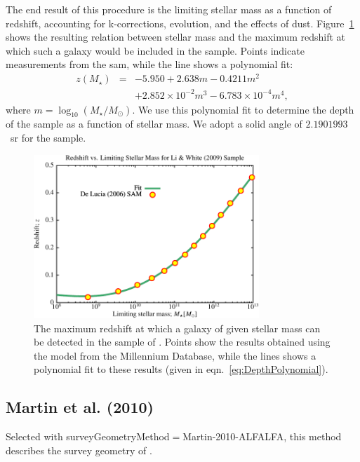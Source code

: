 The end result of this procedure is the limiting stellar mass as a function of redshift, accounting for k-corrections, evolution, and the effects of dust. Figure~\ref{fig:SDSSDepthFit} shows the resulting relation between stellar mass and the maximum redshift at which such a galaxy would be included in the sample. Points indicate measurements from the \gls{sam}, while the line shows a polynomial fit:
\begin{eqnarray}
 z(M_\star) &=& -5.950 + 2.638 m - 0.4211 m^2 \nonumber \\ 
            & & + 2.852\times 10^{-2} m^3 - 6.783 \times 10^{-4} m^4,
 \label{eq:DepthPolynomial}
\end{eqnarray}
where $m= \log_{10}(M_\star/M_\odot)$. We use this polynomial fit to determine the depth of the sample as a function of stellar mass. We adopt a solid angle of $2.1901993$~sr \citep{percival_shape_2007} for the sample.

\begin{figure}
 \includegraphics[width=85mm,trim=0mm 0mm 0mm 4mm,clip]{Plots/DataAnalysis/SDSSMassLuminosityRelation.pdf}
 \caption{The maximum redshift at which a galaxy of given stellar mass can be detected in the sample of \protect\cite{li_distribution_2009}. Points show the results obtained using the \protect\cite{de_lucia_hierarchical_2007} model from the Millennium Database, while the lines shows a polynomial fit to these results (given in eqn.~\ref{eq:DepthPolynomial}).}
 \label{fig:SDSSDepthFit}
\end{figure}

\subsection{Martin et al. (2010)}

Selected with {\normalfont \ttfamily surveyGeometryMethod}$=${\normalfont \ttfamily Martin-2010-ALFALFA}, this method describes the survey geometry of \cite{martin_arecibo_2010}. 

